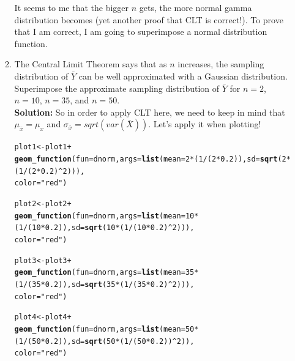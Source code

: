 \documentclass{article}\usepackage[]{graphicx}\usepackage[]{color}
\makeatletter
\newcommand{\hlnum}[1]{\textcolor[rgb]{0.686,0.059,0.569}{#1}}%
\newcommand{\hlstr}[1]{\textcolor[rgb]{0.192,0.494,0.8}{#1}}%
\newcommand{\hlopt}[1]{\textcolor[rgb]{0,0,0}{#1}}%
\newcommand{\hlstd}[1]{\textcolor[rgb]{0.345,0.345,0.345}{#1}}%
\newcommand{\hlkwb}[1]{\textcolor[rgb]{0.69,0.353,0.396}{#1}}%
\newcommand{\hlkwc}[1]{\textcolor[rgb]{0.333,0.667,0.333}{#1}}%
\newcommand{\hlkwd}[1]{\textcolor[rgb]{0.737,0.353,0.396}{\textbf{#1}}}%
\newenvironment{kframe}{%
 \def\at@end@of@kframe{}%
 \ifinner\ifhmode%
  \def\at@end@of@kframe{\end{minipage}}%
  \begin{minipage}{\columnwidth}%
 \fi\fi%
 \def\FrameCommand##1{\hskip\@totalleftmargin \hskip-\fboxsep
 \colorbox{shadecolor}{##1}\hskip-\fboxsep
     \hskip-\linewidth \hskip-\@totalleftmargin \hskip\columnwidth}%
 \MakeFramed {\advance\hsize-\width
   \@totalleftmargin\z@ \linewidth\hsize
   \@setminipage}}%
 {\par\unskip\endMakeFramed%
 \at@end@of@kframe}
\newenvironment{knitrout}{}{} %
\makeatother
\begin{document}
\begin{enumerate}
\begin{enumerate}
It seems to me that the bigger $n$ gets, the more normal gamma distribution becomes (yet another proof that CLT is correct!). To prove that I am correct, I am going to superimpose a normal distribution function.
	  \item The Central Limit Theorem says that as $n$ increases, the sampling 
	  distribution of $\bar{Y}$ can be well approximated with a Gaussian 
	  distribution. Superimpose the approximate sampling distribution of $\bar{Y}$
	  for $n=2$, $n=10$, $n=35$, and $n=50$.\\
\textbf{Solution:} So in order to apply CLT here, we need to keep in mind that $\mu_{\bar{x}}=\mu_{x}$ and $\sigma_{\bar{x}}=sqrt(var(\bar{X}))$. Let's apply it when plotting!
\begin{knitrout}
\color{fgcolor}\begin{kframe}
\begin{alltt}
\hlstd{plot1} \hlkwb{<-} \hlstd{plot1}\hlopt{+}
  \hlkwd{geom_function}\hlstd{(}\hlkwc{fun}\hlstd{=dnorm,} \hlkwc{args}\hlstd{=}\hlkwd{list}\hlstd{(}\hlkwc{mean}\hlstd{=}\hlnum{2}\hlopt{*}\hlstd{(}\hlnum{1}\hlopt{/}\hlstd{(}\hlnum{2}\hlopt{*}\hlnum{0.2}\hlstd{)),} \hlkwc{sd}\hlstd{=}\hlkwd{sqrt}\hlstd{(}\hlnum{2}\hlopt{*}\hlstd{(}\hlnum{1}\hlopt{/}\hlstd{(}\hlnum{2}\hlopt{*}\hlnum{0.2}\hlstd{)}\hlopt{^}\hlnum{2}\hlstd{))),}
                \hlkwc{color}\hlstd{=}\hlstr{"red"}\hlstd{)}

\hlstd{plot2} \hlkwb{<-} \hlstd{plot2}\hlopt{+}
  \hlkwd{geom_function}\hlstd{(}\hlkwc{fun}\hlstd{=dnorm,} \hlkwc{args}\hlstd{=}\hlkwd{list}\hlstd{(}\hlkwc{mean}\hlstd{=}\hlnum{10}\hlopt{*}\hlstd{(}\hlnum{1}\hlopt{/}\hlstd{(}\hlnum{10}\hlopt{*}\hlnum{0.2}\hlstd{)),} \hlkwc{sd}\hlstd{=}\hlkwd{sqrt}\hlstd{(}\hlnum{10}\hlopt{*}\hlstd{(}\hlnum{1}\hlopt{/}\hlstd{(}\hlnum{10}\hlopt{*}\hlnum{0.2}\hlstd{)}\hlopt{^}\hlnum{2}\hlstd{))),}
                \hlkwc{color}\hlstd{=}\hlstr{"red"}\hlstd{)}

\hlstd{plot3} \hlkwb{<-} \hlstd{plot3}\hlopt{+}
  \hlkwd{geom_function}\hlstd{(}\hlkwc{fun}\hlstd{=dnorm,} \hlkwc{args}\hlstd{=}\hlkwd{list}\hlstd{(}\hlkwc{mean}\hlstd{=}\hlnum{35}\hlopt{*}\hlstd{(}\hlnum{1}\hlopt{/}\hlstd{(}\hlnum{35}\hlopt{*}\hlnum{0.2}\hlstd{)),} \hlkwc{sd}\hlstd{=}\hlkwd{sqrt}\hlstd{(}\hlnum{35}\hlopt{*}\hlstd{(}\hlnum{1}\hlopt{/}\hlstd{(}\hlnum{35}\hlopt{*}\hlnum{0.2}\hlstd{)}\hlopt{^}\hlnum{2}\hlstd{))),}
                \hlkwc{color}\hlstd{=}\hlstr{"red"}\hlstd{)}

\hlstd{plot4} \hlkwb{<-} \hlstd{plot4}\hlopt{+}
  \hlkwd{geom_function}\hlstd{(}\hlkwc{fun}\hlstd{=dnorm,} \hlkwc{args}\hlstd{=}\hlkwd{list}\hlstd{(}\hlkwc{mean}\hlstd{=}\hlnum{50}\hlopt{*}\hlstd{(}\hlnum{1}\hlopt{/}\hlstd{(}\hlnum{50}\hlopt{*}\hlnum{0.2}\hlstd{)),} \hlkwc{sd}\hlstd{=}\hlkwd{sqrt}\hlstd{(}\hlnum{50}\hlopt{*}\hlstd{(}\hlnum{1}\hlopt{/}\hlstd{(}\hlnum{50}\hlopt{*}\hlnum{0.2}\hlstd{))}\hlopt{^}\hlnum{2}\hlstd{)),}
                \hlkwc{color}\hlstd{=}\hlstr{"red"}\hlstd{)}


\end{alltt}
\end{kframe}
\end{knitrout}
\end{enumerate}
\end{enumerate}
\end{document}
